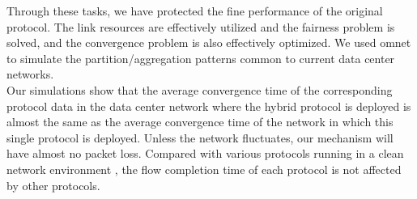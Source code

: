 \documentclass[conference]{IEEEtran}
\begin{document}
\indent Through these tasks, we have protected the fine performance of the original protocol. The link resources are effectively utilized and the fairness problem is solved, and the convergence problem is also effectively optimized. We used omnet to simulate the partition/aggregation patterns common to current data center networks.\\
\indent Our simulations show that the average convergence time of the corresponding protocol data in the data center network where the hybrid protocol is deployed is almost the same as the average convergence time of the network in which this single protocol is deployed. Unless the network fluctuates, our mechanism will have almost no packet loss. Compared with various protocols running in a clean network environment , the flow completion time of each protocol is not affected by other protocols.
\end{document}
